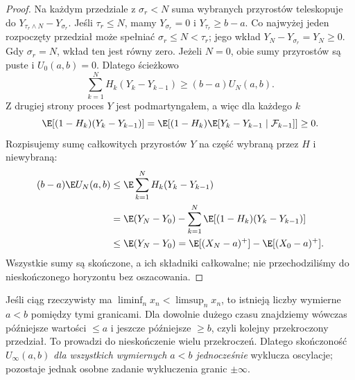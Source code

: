 \begin{proof}
Na każdym przedziale z $\sigma_r<N$
suma wybranych przyrostów teleskopuje do
$Y_{\tau_r\wedge N}-Y_{\sigma_r}$.
Jeśli $\tau_r\leq N$, mamy
$Y_{\sigma_r}=0$ i $Y_{\tau_r}\geq b-a$.
Co najwyżej jeden rozpoczęty przedział może
spełniać $\sigma_r\leq N<\tau_r$; jego wkład
$Y_N-Y_{\sigma_r}=Y_N\geq0$.
Gdy $\sigma_r=N$, wkład ten jest równy zero.
Jeżeli $N=0$, obie sumy przyrostów są puste
i $U_0(a,b)=0$.
Dlatego ścieżkowo
\[
\sum_{k=1}^N H_k(Y_k-Y_{k-1})
 \geq(b-a)U_N(a,b).
\]
Z drugiej strony proces $Y$ jest podmartyngałem,
a więc dla każdego $k$
\[
\E[(1-H_k)(Y_k-Y_{k-1})]
=\E[(1-H_k)\E[Y_k-Y_{k-1}\mid\mathcal F_{k-1}]]\geq0.
\]
Rozpisujemy sumę całkowitych przyrostów $Y$ na
część wybraną przez $H$ i niewybraną:
\begin{align*}
(b-a)\E U_N(a,b)
&\leq\E\sum_{k=1}^NH_k(Y_k-Y_{k-1})\\
&=\E(Y_N-Y_0)
 -\sum_{k=1}^N\E[(1-H_k)(Y_k-Y_{k-1})]\\
&\leq\E(Y_N-Y_0)
=\E[(X_N-a)^+]-\E[(X_0-a)^+].
\end{align*}
Wszystkie sumy są skończone, a ich składniki
całkowalne; nie przechodziliśmy do nieskończonego
horyzontu bez oszacowania.
\end{proof}


\begin{uwaga}
Jeśli ciąg rzeczywisty ma
$\liminf_nx_n<\limsup_nx_n$, to istnieją
liczby wymierne $a<b$ pomiędzy tymi granicami.
Dla dowolnie dużego czasu znajdziemy wówczas
późniejsze wartości $\leq a$ i jeszcze późniejsze
$\geq b$, czyli kolejny przekroczony przedział.
To prowadzi do nieskończenie wielu przekroczeń.
Dlatego skończoność $U_\infty(a,b)$
\emph{dla wszystkich wymiernych $a<b$ jednocześnie}
wyklucza oscylacje; pozostaje jednak osobne
zadanie wykluczenia granic $\pm\infty$.
\end{uwaga}

